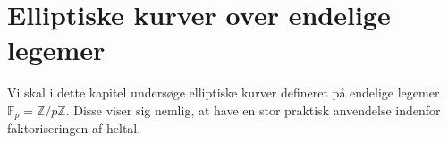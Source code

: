 \chapter{Elliptiske kurver over endelige legemer}

Vi skal i dette kapitel undersøge elliptiske kurver defineret
på endelige legemer $\mathbb{F}_p = \mathbb{Z}/p \mathbb{Z}$. 
Disse viser sig nemlig, at have en stor praktisk anvendelse 
indenfor faktoriseringen af heltal.